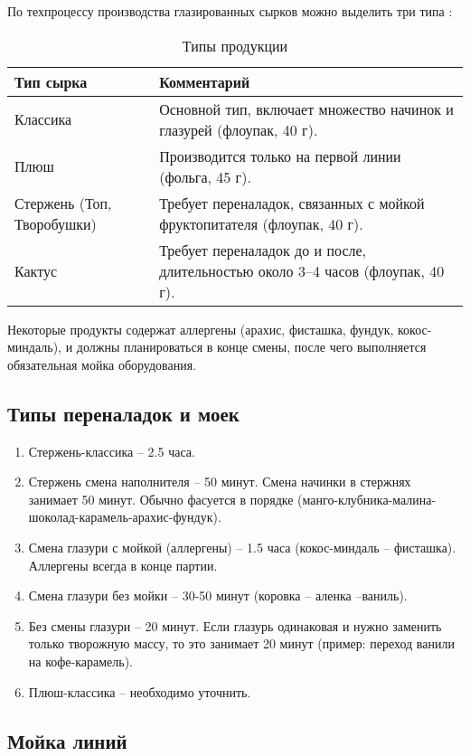 По техпроцессу производства глазированных сырков можно выделить три типа :
\begin{table}[h]
\centering
\caption{Типы продукции}
\begin{tabularx}{\textwidth}{|l|X|}
\hline
\textbf{Тип сырка} & \textbf{Комментарий} \\
\hline
Классика                   & Основной тип, включает множество начинок и глазурей (флоупак, 40 г). \\
\hline
Плюш                       & Производится только на первой линии (фольга, 45 г). \\
\hline
Стержень (Топ, Творобушки) & Требует переналадок, связанных с мойкой фруктопитателя (флоупак, 40 г). \\
\hline
Кактус                     & Требует переналадок до и после, длительностью около 3--4 часов (флоупак, 40 г). \\
\hline
\end{tabularx}
\end{table}

Некоторые продукты содержат аллергены (арахис, фисташка, фундук, кокос-миндаль), и должны планироваться в конце смены, после чего выполняется обязательная мойка оборудования.

\subsection{Типы переналадок и моек}

\begin{enumerate}
  \item Стержень-классика – 2.5 часа. 
  \item Стержень смена наполнителя – 50 минут. Смена начинки в стержнях занимает 50 минут. Обычно фасуется в порядке (манго-клубника-малина-шоколад-карамель-арахис-фундук).
  \item Смена глазури с мойкой (аллергены) – 1.5 часа (кокос-миндаль – фисташка). Аллергены всегда в конце партии.
  \item Смена глазури без мойки – 30-50 минут (коровка – аленка –ваниль).
  \item Без смены глазури – 20 минут. Если глазурь одинаковая и нужно заменить только творожную массу, то это занимает 20 минут (пример: переход ванили на кофе-карамель).
  \item Плюш-классика – необходимо уточнить.
\end{enumerate}

\subsection{Мойка линий}


